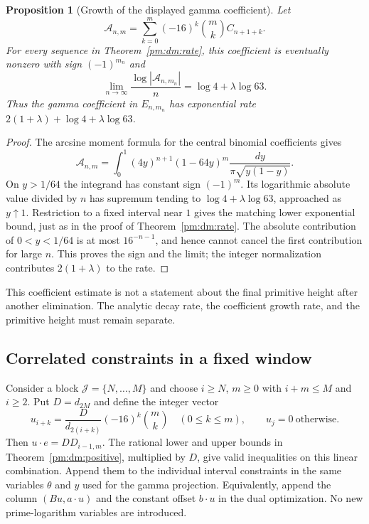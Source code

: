 \documentclass[11pt,a4paper]{article}
\newtheorem{proposition}[theorem]{Proposition}
\theoremstyle{definition}
\theoremstyle{remark}
\numberwithin{equation}{section}
\begin{document}
\begin{proposition}[Growth of the displayed gamma coefficient]
\label{pm:dm:coefficient}
Let
\[
 \mathcal A_{n,m}=\sum_{k=0}^m(-16)^k\binom mk C_{n+1+k}.
\]
For every sequence in Theorem~\ref{pm:dm:rate}, this coefficient is eventually
nonzero with sign $(-1)^{m_n}$ and
\begin{equation}\label{pm:dm:coefficient-rate}
 \lim_{n\to\infty}\frac{\log|\mathcal A_{n,m_n}|}n
 =\log4+\lambda\log63.
\end{equation}
Thus the gamma coefficient in $E_{n,m_n}$ has exponential rate
$2(1+\lambda)+\log4+\lambda\log63$.
\end{proposition}
\begin{proof}
The arcsine moment formula for the central binomial coefficients gives
\[
 \mathcal A_{n,m}=\int_0^1
 (4y)^{n+1}(1-64y)^m\frac{dy}{\pi\sqrt{y(1-y)}}.
\]
On $y>1/64$ the integrand has constant sign $(-1)^m$.  Its logarithmic
absolute value divided by $n$ has supremum tending to
$\log4+\lambda\log63$, approached as $y\uparrow1$.  Restriction to a
fixed interval near $1$ gives the matching lower exponential bound, just
as in the proof of Theorem~\ref{pm:dm:rate}.  The absolute contribution of
$0<y<1/64$ is at most $16^{-n-1}$, and hence cannot cancel the first
contribution for large $n$.  This proves the sign and the limit; the
integer normalization contributes $2(1+\lambda)$ to the rate.
\end{proof}

This coefficient estimate is not a statement about the final primitive
height after another elimination.  The analytic decay rate, the
coefficient growth rate, and the primitive height must remain separate.

\subsection{Correlated constraints in a fixed window}

Consider a block $\mathcal J=\{N,\ldots,M\}$ and choose $i\ge N$,
$m\ge0$ with $i+m\le M$ and $i\ge2$.  Put $D=d_{2M}$ and define
the integer vector
\begin{equation}\label{pm:dm:cut-vector}
 u_{i+k}=\frac{D}{d_{2(i+k)}}(-16)^k\binom mk\quad(0\le k\le m),
 \qquad u_j=0\ \text{otherwise}.
\end{equation}
Then $u\cdot e=D D_{i-1,m}$.  The rational lower and upper bounds in
Theorem~\ref{pm:dm:positive}, multiplied by $D$, give valid inequalities
on this linear combination.  Append them to the individual interval
constraints in the same variables $\theta$ and $y$ used for the gamma
projection.  Equivalently, append the column $(Bu,a\cdot u)$ and the
constant offset $b\cdot u$ in the dual optimization.  No new prime-logarithm
variables are introduced.
\end{document}
